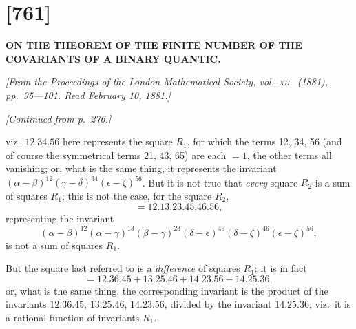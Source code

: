 \documentclass[11pt,a4paper,english]{article}
\theoremstyle{plain}
\begin{document}
\setcounter{page}{301}


\section*{[761]}

\begin{center}
\textbf{ON THE THEOREM OF THE FINITE NUMBER OF THE COVARIANTS OF A BINARY QUANTIC.}
\end{center}

\noindent\textit{[From the \textit{Proceedings of the London Mathematical Society}, vol.\ \textsc{xii}.\ (1881), pp.\ 95---101. Read February 10, 1881.]}

\vspace{0.5\baselineskip}

\noindent\textit{[Continued from p.\ 276.]}

\vspace{\baselineskip}

viz.\ $12.34.56$ here represents the square $R_1$, for which the terms 12, 34, 56 (and of course the symmetrical terms 21, 43, 65) are each $=1$, the other terms all vanishing; or, what is the same thing, it represents the invariant $(\alpha-\beta)^{12}(\gamma-\delta)^{34}(\epsilon-\zeta)^{56}$. But it is not true that \textit{every} square $R_2$ is a sum of squares $R_1$; this is not the case, for the square $R_2$,
\[
=12.13.23.45.46.56,
\]
representing the invariant
\[
(\alpha-\beta)^{12}(\alpha-\gamma)^{13}(\beta-\gamma)^{23}(\delta-\epsilon)^{45}(\delta-\zeta)^{46}(\epsilon-\zeta)^{56},
\]
is not a sum of squares $R_1$.

But the square last referred to is a \textit{difference} of squares $R_1$: it is in fact
\[
=12.36.45 + 13.25.46 + 14.23.56 - 14.25.36,
\]
or, what is the same thing, the corresponding invariant is the product of the invariants $12.36.45$, $13.25.46$, $14.23.56$, divided by the invariant $14.25.36$; viz.\ it is a rational function of invariants $R_1$.
\end{document}
